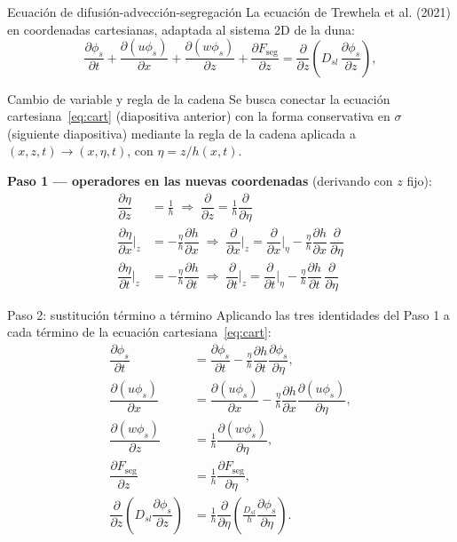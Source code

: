 \documentclass[11pt]{beamer}
\newcommand{\pd}[2]{\dfrac{\partial #1}{\partial #2}}
\begin{document}
\begin{frame}{Ecuación de difusión-advección-segregación}
  La ecuación de Trewhela et al. (2021) en coordenadas cartesianas, 
  adaptada al sistema 2D de la duna:
  \begin{equation}
    \pd{\phi_s}{t} + \pd{(u\phi_s)}{x} + \pd{(w\phi_s)}{z}
    + \pd{F_{\mathrm{seg}}}{z}
    = \pd{}{z}\!\left(D_{sl}\,\pd{\phi_s}{z}\right),
    \label{eq:cart}
\end{equation}
\end{frame}

\begin{frame}{Cambio de variable y regla de la cadena}
Se busca conectar la ecuación cartesiana~\eqref{eq:cart} (diapositiva anterior) con la forma conservativa en $\sigma$ (siguiente diapositiva) mediante la regla de la cadena aplicada a $(x,z,t)\to(x,\eta,t)$, con $\eta=z/h(x,t)$.

\vspace{6pt}
\textbf{Paso 1 — operadores en las nuevas coordenadas} (derivando con $z$ fijo):
\begin{align}
    \pd{\eta}{z} &= \frac{1}{h}
    \;\Longrightarrow\;
    \boxed{\pd{}{z} = \frac{1}{h}\pd{}{\eta}}\\[4pt]
    \pd{\eta}{x}\bigg|_z &= -\frac{\eta}{h}\pd{h}{x}
    \;\Longrightarrow\;
    \boxed{\pd{}{x}\bigg|_z = \pd{}{x}\bigg|_\eta - \frac{\eta}{h}\pd{h}{x}\,\pd{}{\eta}}\\[4pt]
    \pd{\eta}{t}\bigg|_z &= -\frac{\eta}{h}\pd{h}{t}
    \;\Longrightarrow\;
    \boxed{\pd{}{t}\bigg|_z = \pd{}{t}\bigg|_\eta - \frac{\eta}{h}\pd{h}{t}\,\pd{}{\eta}}
\end{align}
\end{frame}

\begin{frame}{Paso 2: sustitución término a término}
Aplicando las tres identidades del Paso 1 a cada término de la ecuación cartesiana~\eqref{eq:cart}:
\begin{align}
    \pd{\phi_s}{t} &= \pd{\phi_s}{t} - \frac{\eta}{h}\pd{h}{t}\pd{\phi_s}{\eta}, \\
    \pd{(u\phi_s)}{x} &= \pd{(u\phi_s)}{x} - \frac{\eta}{h}\pd{h}{x}\pd{(u\phi_s)}{\eta}, \\
    \pd{(w\phi_s)}{z} &= \frac1h\pd{(w\phi_s)}{\eta}, \\
    \pd{F_{\mathrm{seg}}}{z} &= \frac1h\pd{F_{\mathrm{seg}}}{\eta}, \\
    \pd{}{z}\!\left(D_{sl}\pd{\phi_s}{z}\right) &= \frac1h\pd{}{\eta}\!\left(\frac{D_{sl}}{h}\pd{\phi_s}{\eta}\right).
\end{align}
\end{frame}
\end{document}
